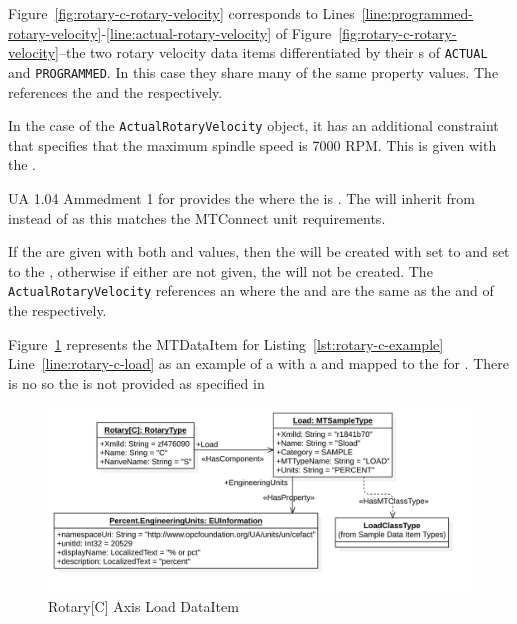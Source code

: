 Figure~\ref{fig:rotary-c-rotary-velocity} corresponds to Lines~\ref{line:programmed-rotary-velocity}-\ref{line:actual-rotary-velocity} of Figure~\ref{fig:rotary-c-rotary-velocity}--the two rotary velocity data items differentiated by their s of \texttt{ACTUAL} and \texttt{PROGRAMMED}. In this case they share many of the same property values. The  references the  and the  respectively.

In the case of the \texttt{ActualRotaryVelocity} object, it has an additional constraint that specifies that the maximum spindle speed is 7000 RPM. This is given with the . 

UA 1.04 Ammedment 1 \cite{UAAmend1} for  provides the   where the  is . The  will inherit from  instead of   as this matches the MTConnect unit requirements.

If the  are given with both  and  values, then the  will be created with  set to  and  set to the , otherwise if either are not given, the  will not be created. The \texttt{ActualRotaryVelocity} references an  where the  and  are the same as the  and  of the  respectively. 

\FloatBarrier

Figure~\ref{fig:rotary-c-load} represents the  \gls{MTDataItem} for Listing~\ref{lst:rotary-c-example} Line~\ref{line:rotary-c-load} as an example of a  with a  and mapped to the  for . There is no  so the  is not provided as specified in 

\begin{figure}[ht]
  \centering
  \includegraphics[width=1.0\textwidth]{diagrams/mtconnect-mapping/rotary-c-load.png}
  \caption{Rotary[C] Axis Load DataItem}
  \label{fig:rotary-c-load}
\end{figure}

